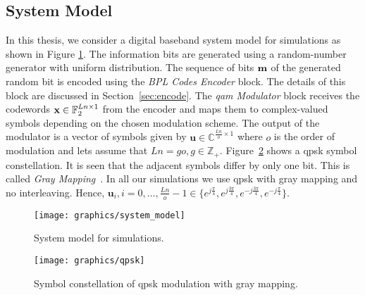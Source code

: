 \subsection{System Model}\label{sec:sys_mod}
In this thesis, we consider a digital baseband system model for simulations as shown in Figure \ref{fig:system}. The information bits are generated using a random-number generator with uniform distribution. The sequence of bits $\mathbf{m}$ of the generated random bit is encoded using the \emph{BPL Codes Encoder} block. The details of this block are discussed in Section~\ref{sec:encode}. The \emph{\ac{qam} Modulator} block receives the codewords $\mathbf{x}\in\mathbb{F}_2^{Ln\times 1}$ from the encoder and maps them to complex-valued symbols depending on the chosen modulation scheme. The output of the modulator is a vector of symbols given by $\mathbf{u}\in\mathbb{C}^{\frac{Ln}{o}\times 1}$ where $o$ is the order of modulation and lets assume that $Ln=go, g\in\mathbb{Z}_+$. Figure~\ref{fig:qpsk} shows a \ac{qpsk} symbol constellation. It is seen that the adjacent symbols differ by only one bit. This is called \emph{Gray Mapping}~\cite{proak}. In all our simulations we use \ac{qpsk} with gray mapping and no interleaving. Hence, $\mathbf{u}_i,i=0,\dots,\frac{Ln}{o}-1\in\{e^{j\frac{\pi}{4}},e^{j\frac{3\pi}{4}},e^{-j\frac{3\pi}{4}},e^{-j\frac{\pi}{4}}\}$.
\begin{figure}[htbp]
  \centering
  \texttt{[image: graphics/system\_model]}
  \caption{System model for simulations.}
  \label{fig:system}
\end{figure}

\begin{figure}[htbp]
  \centering
  \texttt{[image: graphics/qpsk]}
  \caption{Symbol constellation of \ac{qpsk} modulation with gray mapping.}
  \label{fig:qpsk}
\end{figure}

